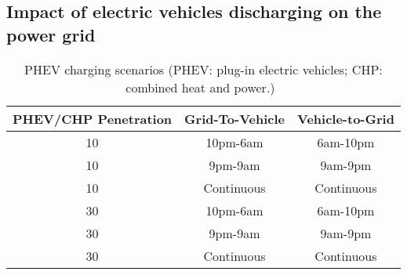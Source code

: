 \subsection{Impact of electric vehicles discharging on the power grid}

\begin{table}[t]
	\caption{PHEV charging scenarios (PHEV: plug-in electric vehicles; CHP: combined heat and power.)~\cite{YC_Green,YC_Acha}}
	\centering
	\begin{tabular}{|c||c|c|}		
		\hline
		PHEV/CHP Penetration & Grid-To-Vehicle & Vehicle-to-Grid \\
		\hline \hline 
		10  & 10pm-6am & 6am-10pm \\
		\hline
		10 & 9pm-9am    & 9am-9pm \\
		\hline
		10 & Continuous & Continuous \\
		\hline
		30 & 10pm-6am   & 6am-10pm \\
		\hline
		30 & 9pm-9am    & 9am-9pm \\
		\hline
		30 & Continuous & Continuous \\	
		\hline			
	\end{tabular}		
	\label{YC_tab_v2G}
\end{table}

